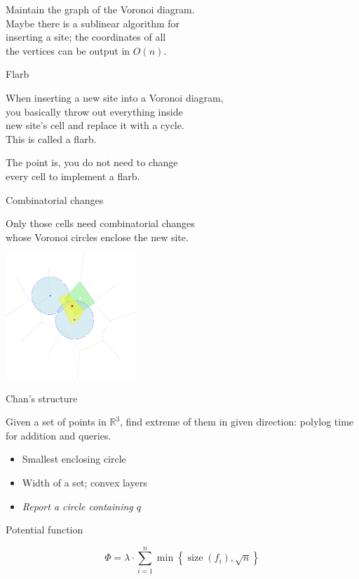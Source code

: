 \documentclass[17pt]{extarticle}
\newcommand{\newslide}[1]{\newpage \begin{center} \large #1 \end{center}}
\DeclareMathOperator{\size}{size}
\begin{document}
Maintain the graph of the Voronoi diagram. \\
Maybe there is a sublinear algorithm for \\
inserting a site; the coordinates of all \\
the vertices can be output in \(O(n)\).

\newslide{Flarb} \vspace{-6mm}

When inserting a new site into a Voronoi diagram, \\
you basically throw out everything inside \\
new site's cell and replace it with a cycle. \\
This is called a flarb.

The point is, you do not need to change \\
every cell to implement a flarb.

\newslide{Combinatorial changes} \vspace{-7mm}

Only those cells need combinatorial changes \\
whose Voronoi circles enclose the new site.

\begin{center}
	\includegraphics[height=4.7cm]{figs/identChanges-dark}
\end{center}

\newslide{Chan's structure} \vspace{-5mm}

Given a set of points in \( \mathbb R^3 \), find extreme of them in given direction: polylog time for addition and queries.

\begin{itemize}
	\item Smallest enclosing circle
	\item Width of a set; convex layers
	\item {\it Report a circle containing \(q\)}
\end{itemize}

\newslide{Potential function}
\[ Φ = λ \cdot \sum\limits_{i=1}^n
   \min\left\{
      \size(f_i), \sqrt{n}
   \right\}\]
\end{document}
